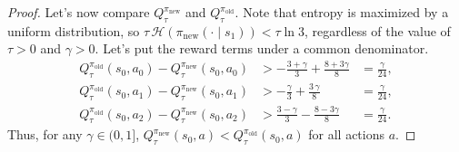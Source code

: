 \documentclass[twoside,11pt]{article}
\newcommand{\entropy}{\mathcal{H}}
\newcommand{\pinew}{{\pi_\mathrm{new}}}
\newcommand{\piold}{{\pi_\mathrm{old}}}
\begin{document}
\begin{proof}
Let's now compare $Q_\tau^\pinew$ and $Q_\tau^\piold$. Note that entropy is maximized by a uniform distribution, so $\tau \,\entropy(\pinew(\cdot \mid s_1)) < \tau \ln 3$, regardless of the value of $\tau > 0$ and $\gamma > 0$. Let's put the reward terms under a common denominator. 
\begin{align*}
    Q^\piold_\tau(s_0, a_0) - Q^\pinew_\tau(s_0, a_0) &> - \frac{3 + \gamma}{3} + \frac{8 + 3 \gamma}{8} &= \frac{\gamma}{24},\\
    Q^\piold_\tau(s_0, a_1) - Q^\pinew_\tau(s_0, a_1) &> - \frac{\gamma}{3} + \frac{3\, \gamma }{8}  &= \frac{\gamma}{24},\\
    Q^\piold_\tau(s_0, a_2) - Q^\pinew_\tau(s_0, a_2) &> \frac{3 - \gamma}{3} - \frac{8 - 3 \gamma}{8} &= \frac{\gamma}{24}.
\end{align*}
Thus, for any $\gamma \in (0, 1]$, $Q_\tau^\pinew(s_0, a) < Q_\tau^\piold(s_0, a)$ for all actions $a$. 


\end{proof}
\end{document}
